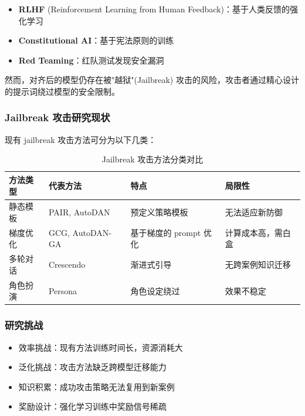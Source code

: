 \documentclass[12pt,a4paper]{article}
\newcommand{\highlight}[1]{\textcolor{primaryblue}{\textbf{#1}}}
\newcommand{\warning}[1]{\textcolor{warningorange}{#1}}
\newcommand{\danger}[1]{\textcolor{dangerred}{#1}}
\begin{document}
\begin{itemize}
    \item \highlight{RLHF} (Reinforcement Learning from Human Feedback)：基于人类反馈的强化学习
    \item \highlight{Constitutional AI}：基于宪法原则的训练
    \item \highlight{Red Teaming}：红队测试发现安全漏洞
\end{itemize}

然而，对齐后的模型仍存在被"越狱"(Jailbreak) 攻击的风险，攻击者通过精心设计的提示词绕过模型的安全限制。

\subsubsection{Jailbreak 攻击研究现状}

现有 jailbreak 攻击方法可分为以下几类：

\begin{table}[H]
    \centering
    \begin{tabular}{@{}l l l l@{}}
        \toprule
        \rowcolor{tableheader}
        \textbf{方法类型} & \textbf{代表方法} & \textbf{特点} & \textbf{局限性} \\
        \midrule
        静态模板 & PAIR, AutoDAN & 预定义策略模板 & 无法适应新防御 \\
        梯度优化 & GCG, AutoDAN-GA & 基于梯度的 prompt 优化 & 计算成本高，需白盒 \\
        多轮对话 & Crescendo & 渐进式引导 & 无跨案例知识迁移 \\
        角色扮演 & Persona & 角色设定绕过 & 效果不稳定 \\
        \bottomrule
    \end{tabular}
    \caption{Jailbreak 攻击方法分类对比}
    \label{tab:attack_methods}
\end{table}

\subsubsection{研究挑战}

\begin{itemize}
    \item \danger{效率挑战}：现有方法训练时间长，资源消耗大
    \item \danger{泛化挑战}：攻击方法缺乏跨模型迁移能力
    \item \warning{知识积累}：成功攻击策略无法复用到新案例
    \item \warning{奖励设计}：强化学习训练中奖励信号稀疏
\end{itemize}
\end{document}
